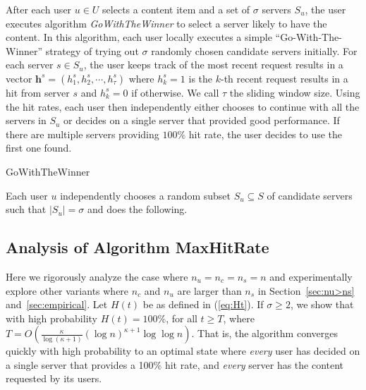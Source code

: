 \documentclass[conference]{IEEEtran}
\begin{document}
After each user $u \in U$ selects a content item and a set of $\sigma$ servers $S_u$,  the user executes algorithm \textsl{GoWithTheWinner} to select a server likely to have the content. In this algorithm, each user locally executes a simple ``Go-With-The-Winner'' strategy of trying out $\sigma$ randomly chosen candidate servers initially. For each server $s\in S_u$, the user keeps track of the most recent request results in a vector $\mathbf{h}^s=(h^s_1,h^s_2,\cdots,h^s_{\tau})$ where $h^s_k=1$ is the $k$-th recent request results in a hit from server $s$ and $h^s_k=0$ if otherwise. We call $\tau$ the sliding window size. Using the hit rates, each user then independently either chooses to continue with all the servers in $S_u$ or decides on a  single server that provided good performance. If there are multiple servers providing $100\%$ hit rate, the user decides to use the first one found.



  \LinesNumbered
  \PrintSemicolon
  \SetAlgoLined
  \begin{algorithm}[t]
    \caption{GoWithTheWinner}
Each user $u$ independently chooses a random subset $S_u \subseteq S$ of candidate servers such that $|S_u| = \sigma$ and does the following.\\
  \end{algorithm}



\subsection{Analysis of Algorithm MaxHitRate}
Here we rigorously analyze the case where $n_u = n_c = n_s = n$ and experimentally explore other variants where $n_c$ and $n_u$ are larger than $n_s$ in Section~\ref{sec:nu>ns} and~\ref{sec:empirical}.  Let $H(t)$   be as defined in (\ref{eq:Ht}). If $\sigma \geq 2$, we show that with high probability $H(t) = 100\%$, for all $t \geq T$, where $T = O(\frac{\kappa}{\log (\kappa + 1)} (\log n)^{\kappa+1}\log\log n)$. That is,  the algorithm converges quickly with high probability to an optimal state where {\em every} user has decided on a single server that provides a 100\% hit rate,  and {\em every} server has the content requested by its users.
\end{document}

